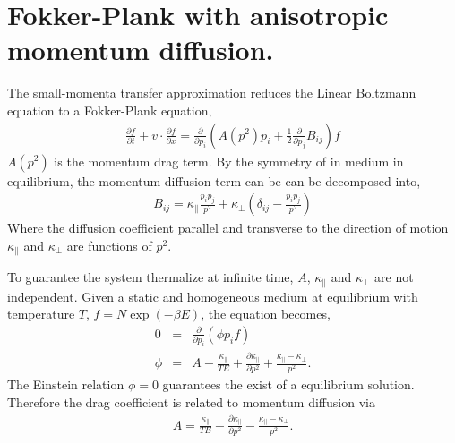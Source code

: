 \documentclass[10pt,a4paper]{article}
\newcommand{\ppi}{\frac{\partial}{\partial p_i}}
\newcommand{\ppj}{\frac{\partial}{\partial p_j}}
\newcommand{\Kpara}{\kappa_{\|}}
\newcommand{\Kperp}{\kappa_{\perp}}
\begin{document}
\section{Fokker-Plank with anisotropic momentum diffusion.}
The small-momenta transfer approximation reduces the Linear Boltzmann equation to a Fokker-Plank equation,
\begin{eqnarray}
\frac{\partial f}{\partial t} + v\cdot\frac{\partial f}{\partial x}
= \ppi \left(A(p^2) p_i + \frac{1}{2}\ppj B_{ij}\right)f 
\end{eqnarray}
$A(p^2)$ is the momentum drag term. 
By the symmetry of in medium in equilibrium, the momentum diffusion term can be can be decomposed into,
\begin{eqnarray}
B_{ij} = \Kpara \frac{p_i p_j}{p^2} + \Kperp \left(\delta_{ij} - \frac{p_i p_j}{p^2}\right)
\end{eqnarray} 
Where the diffusion coefficient parallel and transverse to the direction of motion $\Kpara$ and $\Kperp$ are functions of $p^2$.

To guarantee the system thermalize at infinite time, $A$, $\Kpara$ and $\Kperp$ are not independent.
Given a static and homogeneous medium at equilibrium with temperature $T$, $f = N\exp\left(-\beta E\right)$, the equation becomes,
\begin{eqnarray}
0 &=& \ppi(\phi p_i f)\\
\phi &=& A - \frac{\Kpara}{TE} + \frac{\partial \Kpara}{\partial p^2} + \frac{\Kpara-\Kperp}{p^2}.
\end{eqnarray}
The Einstein relation $\phi = 0$ guarantees the exist of a equilibrium solution.
Therefore the drag coefficient is related to momentum diffusion via
\begin{eqnarray}
A = \frac{\Kpara}{TE} - \frac{\partial \Kpara}{\partial p^2} - \frac{\Kpara-\Kperp}{p^2}.
\end{eqnarray}
\end{document}
